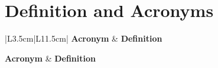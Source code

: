 \part*{Definition and Acronyms}

\begingroup
\renewcommand{\theHtable}{acronym.\arabic{table}}
\small
\renewcommand{\arraystretch}{1.22}
\setlength{\tabcolsep}{6pt}
\begin{longtable}{|L{3.5cm}|L{11.5cm}|}
\hline
{}
\textcolor{fptHeaderText}{\textbf{Acronym}} &
\textcolor{fptHeaderText}{\textbf{Definition}} \\
\hline
\endfirsthead

\hline
{}
\textcolor{fptHeaderText}{\textbf{Acronym}} &
\textcolor{fptHeaderText}{\textbf{Definition}} \\
\hline
\endhead

\hline
\endfoot

\hline
\endlastfoot


\end{longtable}
